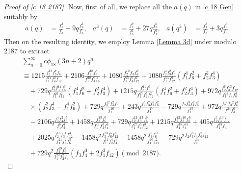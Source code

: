 \documentclass[12pt]{article}
\numberwithin{equation}{section}
\theoremstyle{plain}
\numberwithin{theorem}{section}
\theoremstyle{definition}
\theoremstyle{remark}
\begin{document}
\begin{proof}[Proof of \eqref{c 18 2187}]
    Now, first of all, we replace all the $a(q)$ in \eqref{c 18 Gen}  suitably by
    \begin{align*}
        a(q)&=\frac{f_1^3}{f_3}+9q \frac{f_9^3}{f_3}, &
        a^3(q)&=\frac{f_1^9}{f_3^3}+27 q \frac{f_3^9}{f_1^3}, &
       a(q^3) &=\frac{f_1^3}{f_3}+3q \frac{f_9^3}{f_3}.
    \end{align*}
    Then on the resulting identity, we employ Lemma \ref{Lemma 3d} under modulo 2187 to extract
        \begin{align*}
        &\sum_{n=0}^\infty c\phi_{18}(3n+2)q^n\\&\equiv 1215\frac{f_2^{12} f_3^7 f_6}{f_1^{17} f_4^3 f_{12}}+2106\frac{f_2^{18} f_3^8}{f_1^{20} f_4^6 f_6}+1080 \frac{f_2^{12} f_3 f_6^9}{f_1^{15} f_4^5 f_{12}^3}+1080 \frac{f_2^4 f_3^2 f_6^3}{f_1^{14} f_{12}^2}\left( f_1^4f_6^2+f_2^2 f_3^4\right)\\
        &\quad +729 q\frac{f_2^4 f_3^{14} f_6^3}{f_1^{26} f_{12}^2}\left( f_1^4f_6^2+f_2^2 f_3^4\right)+1215 q\frac{f_3^{11} f_6^6}{f_1^{17} f_2^5 f_{12}^2}\left( f_1^4f_6^2+f_2^2 f_3^4\right)+ 972 q\frac{f_2^6 f_3^{13} f_{12}}{f_1^{23} f_4 f_6^3}\\
        &\quad \times \left( f_2^2 f_3^4-f_1^4f_6^2\right)+729 q \frac{f_3^{12} f_4^2 f_6}{f_1^{16}}+243 q \frac{f_2^5 f_3^7 f_4^2 f_6^2}{f_1^{17}}-729q \frac{f_2 f_3^9 f_4^2 f_6^2}{f_1^{15}}+972q \frac{f_2^{14} f_3^{12} f_6^3}{f_1^{24} f_4^6}\\
        &\quad -2106q \frac{f_3^4 f_4^2 f_6^5}{f_1^8 f_2^4}+1458q \frac{f_3^{13} f_6^6}{f_1^{11} f_2^3 f_4^6}+729 q \frac{f_2^{12} f_3^{13} f_6^9}{f_1^{27} f_4^5 f_{12}^3}+1215 q \frac{f_2^{12} f_3^{10} f_6^9}{f_1^{18} f_4^{14}}+405 q \frac{f_2^7 f_3^{10} f_{12}}{f_1^{18} f_4}\\
        &\quad +2025 q\frac{f_2^{16} f_3^{11} f_{12}^3}{f_1^{21} f_4^7 f_6^3}-1458 q^2\frac{f_3^{13} f_6^5 f_{12}^3}{f_1^{11} f_2^4 f_4^7}+1458 q^2\frac{f_3^8 f_6^{13}}{f_1^{20} f_{12}^2}-729 q^2\frac{f_2 f_3^6 f_4 f_6^2 f_{12}^3}{f_1^{14}}\\
        &\quad +729 q^2\frac{f_3^{19} f_6^3}{f_1^{24} f_2^2 f_4}\left(f_3 f_4^3+2 f_1^3 f_{12}\right) \pmod{2187}.
    \end{align*}
    

\end{proof}
\end{document}
